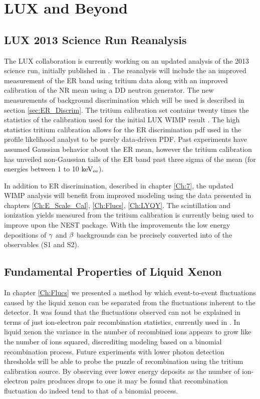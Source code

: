 \renewcommand{\thechapter}{8}

\chapter{LUX and Beyond}
\label{Ch:End}

\section{LUX 2013 Science Run Reanalysis}

The LUX collaboration is currently working on an updated analysis of the 2013 science run, initially published in \cite{LUX_PRL}. The reanalysis will include the an improved measurement of the ER band using tritium data along with an improved calibration of the NR mean using a DD neutron generator. The new measurements of background discrimination which will be used is described in section \ref{sec:ER_Discrim}. The tritium calibration set contains twenty times the statistics of the calibration used for the initial LUX WIMP result \cite{LUX_PRL}. The high statistics tritium calibration allows for the ER discrimination pdf used in the profile likelihood analyst to be purely data-driven PDF. Past experiments have assumed Gaussian behavior about the ER mean, however the tritium calibration has unveiled  non-Gaussian tails of the ER band past three sigma of the mean (for energies between 1 to 10 $\rm keV_{ee}$).

In addition to ER discrimination, described in chapter \ref{Ch:7}, the updated WIMP analysis will benefit from improved modeling using the data presented in chapters \ref{Ch:E_Scale_Cal}, \ref{Ch:Flucs}, \ref{Ch:LYQY}. The scintillation and ionization yields measured from the tritium calibration is currently being used to improve upon the NEST package. With the improvements the low energy depositions of $\rm \gamma$ and $\rm \beta$ backgrounds can be precisely converted into of the observables (S1 and S2). 


\section{Fundamental Properties of Liquid Xenon}
In chapter \ref{Ch:Flucs} we presented a method by which event-to-event fluctuations caused by the liquid xenon can be separated from the fluctuations inherent to the detector. It was found that the fluctuations observed can not be explained in terms of just ion-electron pair recombination statistics, currently used in \cite{NEST_2013}. In liquid xenon the variance in the number of recombined ions appears to grow like the number of ions squared, discrediting modeling based on a binomial recombination process. Future experiments with lower photon detection thresholds will be able to probe the puzzle of recombination using the tritium calibration source. By observing ever lower energy deposits as the number of ion-electron pairs produces drops to one it may be found that recombination fluctuation do indeed tend to that of a binomial process.


